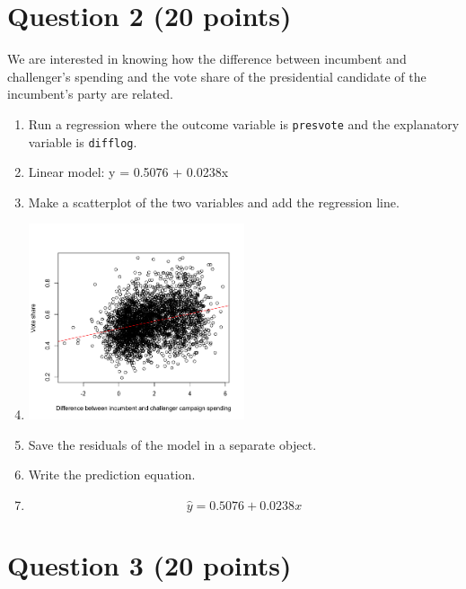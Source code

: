 \documentclass[12pt,letterpaper]{article}
\begin{document}
\section*{Question 2 (20 points)}
\noindent We are interested in knowing how the difference between incumbent and challenger's spending and the vote share of the presidential candidate of the incumbent's party are related.	\vspace{.25cm}
	\begin{enumerate}
		\item Run a regression where the outcome variable is \texttt{presvote} and the explanatory variable is \texttt{difflog}.	\vspace{1cm}
		\item[] Linear model: y = 0.5076 + 0.0238x
		
		\item Make a scatterplot of the two variables and add the regression line.
		\item[]
		\includegraphics[width=0.5\textwidth]{Q2.png}
		
		\item Save the residuals of the model in a separate object.	\vspace{1cm}
		
		\item Write the prediction equation.
		\item[] $$\hat{y} = 0.5076 + 0.0238x$$
	\end{enumerate}
	
	\newpage	
\section*{Question 3 (20 points)}
\end{document}
